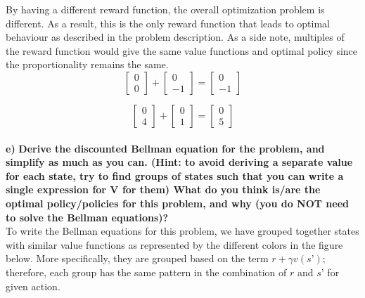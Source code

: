 \documentclass[11pt]{article}
\begin{document}
\noindent
By having a different reward function, the overall optimization problem is
different. As a result, this is the only reward function that leads to optimal
behaviour as described in the problem description. As a side note, multiples of
the reward function would give the same value functions and optimal policy since
the proportionality remains the same. \\

\begin{equation}
\left[\begin{array}{c}
{0} \\
{0}
\end{array}\right]+\left[\begin{array}{c}
{0} \\
{-1}
\end{array}\right]=\left[\begin{array}{c}
{0} \\
{-1}
\end{array}\right]
\end{equation}

\begin{equation}
\left[\begin{array}{l}
{0} \\
{4}
\end{array}\right]+\left[\begin{array}{l}
{0} \\
{1}
\end{array}\right]=\left[\begin{array}{l}
{0} \\
{5}
\end{array}\right]
\end{equation}
\\

\noindent
\textbf{e)}
\noindent
\textbf{Derive the discounted Bellman equation for the problem, and simplify
as much as you can. (Hint: to avoid deriving a separate value for each state,
try to find groups of states such that you can write a single expression for V for
them) What do you think is/are the optimal policy/policies for this problem,
and why (you do NOT need to solve the Bellman equations)?}
\\

\noindent
To write the Bellman equations for this problem, we have grouped together states
with similar value functions as represented by the different colors in the
figure below. More specifically, they are grouped based on the term $r+ \gamma
v(s’)$; therefore, each group has the same pattern in the combination of $r$ and
$s’$ for given action. \\
\end{document}
